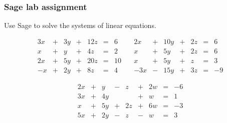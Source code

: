 \documentclass[11pt,ignorenonframetext,]{beamer}
\begin{document}
\begin{frame}\frametitle{Sage lab assignment}

Use Sage to solve the systems of linear equations.

\begin{equation*}
    \begin{array}{ccccccc}
        3x &+& 3y &+& 12z &=& 6 \\
        x  &+& y  &+& 4z  &=& 2 \\
        2x &+& 5y &+& 20z &=& 10 \\
        -x &+& 2y &+& 8z  &=& 4  
    \end{array} \quad \begin{array}{ccccccc}
        2x  &+& 10y &+& 2z &=& 6 \\
        x   &+& 5y  &+& 2z &=& 6 \\
        x   &+& 5y  &+& z  &=& 3 \\
        -3x &-& 15y &+& 3z &=& -9  
    \end{array}
\end{equation*}

\begin{equation*}
    \begin{array}{ccccccccc}
        2x &+& y &-& z &+& 2w &=& -6 \\
        3x &+& 4y & & &+& w &=& 1 \\
        x &+& 5y &+& 2z &+& 6w &=& -3 \\
        5x &+& 2y &-& z &-& w &=& 3
    \end{array}
\end{equation*}

\end{frame}
\end{document}
